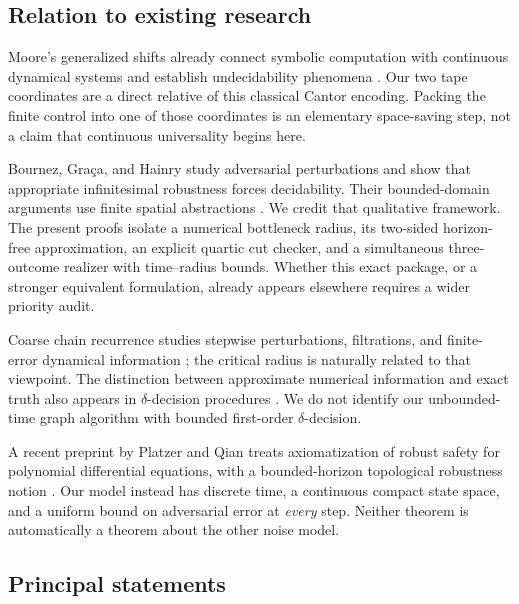 \documentclass[11pt,letterpaper]{article}
\numberwithin{equation}{section}
\theoremstyle{definition}
\theoremstyle{remark}
\begin{document}
\subsection{Relation to existing research}

Moore's generalized shifts already connect symbolic computation with
continuous dynamical systems and establish undecidability phenomena
\cite{Moore1991}.  Our two tape coordinates are a direct relative of this
classical Cantor encoding.  Packing the finite control into one of those
coordinates is an elementary space-saving step, not a claim that continuous
universality begins here.

Bournez, Gra\c{c}a, and Hainry study adversarial perturbations and show that
appropriate infinitesimal robustness forces decidability.  Their bounded-domain
arguments use finite spatial abstractions \cite{BGH2013}.  We credit that
qualitative framework.  The present proofs isolate a numerical bottleneck
radius, its two-sided horizon-free approximation, an explicit quartic cut
checker, and a simultaneous three-outcome realizer with time--radius bounds.
Whether this exact package, or a stronger equivalent formulation, already
appears elsewhere requires a wider priority audit.

Coarse chain recurrence studies stepwise perturbations, filtrations, and
finite-error dynamical information \cite{Yokoyama2025}; the critical radius is
naturally related to that viewpoint.  The distinction between approximate
numerical information and exact truth also appears in $\delta$-decision
procedures \cite{Gao2012}.  We do not identify our unbounded-time graph algorithm
with bounded first-order $\delta$-decision.

A recent preprint by Platzer and Qian treats axiomatization of robust safety
for polynomial differential equations, with a bounded-horizon topological
robustness notion \cite{PlatzerQian2026}.  Our model instead has discrete time,
a continuous compact state space, and a uniform bound on adversarial error
at \emph{every} step.  Neither theorem is automatically a theorem about the
other noise model.

\subsection{Principal statements}
\end{document}
